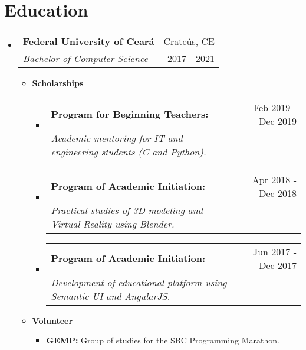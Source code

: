 \documentclass[letterpaper,11pt]{article}
\makeatletter
\newcommand{\resumeSubheading}[4]{
    \vspace{-1pt}\item
        \begin{tabular*}{0.97\textwidth}{l@{\extracolsep{\fill}}r}
            \textbf{#1} & #2 \\
            \textit{\small#3} & \small #4 \\
        \end{tabular*}
    \vspace{-5pt}
}
\newcommand{\resumeScholarship}[4]{
    \vspace{-1pt}\item
        \begin{tabular*}{0.89\textwidth}{l@{\extracolsep{\fill}}r}
            \textbf{#1} & #2 \\
            \textit{\small#3} & \small #4 \\
        \end{tabular*}\vspace{-5pt}
    \vspace{0.3cm}
}
\newcommand{\resumeSubHeadingListStart}{\begin{itemize}[leftmargin=*]}
\newcommand{\resumeSubHeadingListEnd}{\end{itemize}}
\makeatother
\begin{document}
\section{\faGraduationCap \hspace{0.2cm} \Large Education}
    \resumeSubHeadingListStart
        \resumeSubheading
        {Federal University of Ceará}{\faMapMarker \hspace{0.1cm} Crateús, CE}
        {Bachelor of Computer Science}{\faCalendar \hspace{0.1cm} 2017 - 2021}
        \begin{itemize}
            \item \textbf{Scholarships}
                \begin{itemize}
                    \resumeScholarship
                    {Program for Beginning Teachers:}{\faCalendar \hspace{0.1cm} \small Feb 2019 - Dec 2019}
                    {Academic mentoring for IT and engineering students (C and Python).}{}
            
                    \resumeScholarship
                    {Program of Academic Initiation:}{\faCalendar \hspace{0.1cm} \small Apr 2018 - Dec 2018}
                    {Practical studies of 3D modeling and Virtual Reality using Blender.}{}
        
                    \resumeScholarship
                    {Program of Academic Initiation:}{\faCalendar \hspace{0.1cm} \small Jun 2017 - Dec 2017}
                    {Development of educational platform using Semantic UI and AngularJS.}{}
                \end{itemize}
        \end{itemize}
      
        \begin{itemize}
            \item \textbf{Volunteer}
                \begin{itemize}
                    \item \textbf{GEMP:} Group of studies for the SBC Programming Marathon. \href{https://github.com/GEMP-UFC-Crateus}{\scriptsize \faExternalLink}
                \end{itemize}
        \end{itemize}
        
        \vspace{0.1cm}
    \resumeSubHeadingListEnd
  
\end{document}
